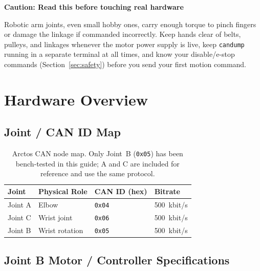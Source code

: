 \documentclass[11pt,letterpaper]{article}
\newenvironment{caution}[1]{%
    \par\addvspace{8pt}%
    \noindent{\color{cautionred}\rule{\linewidth}{0.8pt}}\par\vspace{2pt}
    \noindent\textbf{\color{cautionred}Caution: #1}\par\vspace{2pt}
}{%
    \par\vspace{2pt}\noindent{\color{cautionred}\rule{\linewidth}{0.4pt}}%
    \par\addvspace{8pt}%
}
\begin{document}
\begin{caution}{Read this before touching real hardware}
Robotic arm joints, even small hobby ones, carry enough torque to pinch fingers or damage the linkage if commanded incorrectly. Keep hands clear of belts, pulleys, and linkages whenever the motor power supply is live, keep \texttt{candump} running in a separate terminal at all times, and know your disable/e-stop commands (Section~\ref{sec:safety}) before you send your first motion command.
\end{caution}

\newpage
\section{Hardware Overview}

\subsection{Joint / CAN ID Map}

\begin{table}[h]
\centering
\begin{tabular}{llll}
\toprule
\textbf{Joint} & \textbf{Physical Role} & \textbf{CAN ID (hex)} & \textbf{Bitrate} \\ \midrule
Joint A & Elbow & \texttt{0x04} & 500~kbit/s \\
Joint C & Wrist joint  & \texttt{0x06} & 500~kbit/s \\
Joint B & Wrist rotation & \texttt{0x05} & 500~kbit/s \\ \bottomrule
\end{tabular}
\caption{Arctos CAN node map. Only Joint~B (\texttt{0x05}) has been bench-tested in this guide; A and C are included for reference and use the same protocol.}
\end{table}

\subsection{Joint B Motor / Controller Specifications}
\end{document}
